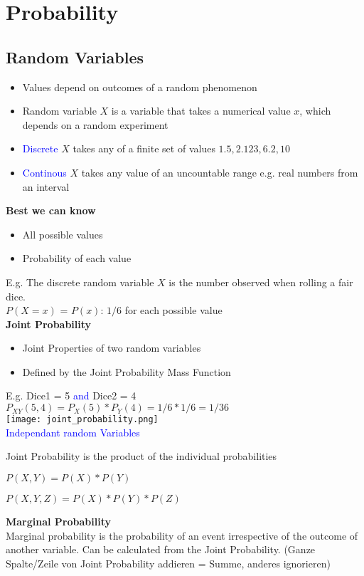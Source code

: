 \section{Probability}
\subsection{Random Variables}
\begin{itemize}
    \item Values depend on outcomes of a random phenomenon
    \item Random variable $X$ is a variable that takes a numerical value $x$, which depends on a random experiment
    \item \textcolor{blue}{Discrete} $X$ takes any of a finite set of values ${1.5, 2.123, 6.2, 10}$
    \item \textcolor{blue}{Continous} $X$ takes any value of an uncountable range e.g. real numbers from an interval
\end{itemize}
\vspace{10pt}
\textbf{Best we can know}
\begin{itemize}
    \item All possible values
    \item Probability of each value
\end{itemize}
E.g. The discrete random variable $X$ is the number observed when rolling a fair dice.\\
$P(X=x)$ = $P(x)$: $1/6$ for each possible value \\

\textbf{Joint Probability}
\begin{itemize}
    \item Joint Properties of two random variables
    \item Defined by the Joint Probability Mass Function
\end{itemize}
E.g. Dice1 = 5 \textcolor{blue}{and} Dice2 = 4\\
$P_{XY}(5,4) = P_X(5) * P_Y(4) = 1/6 * 1/6 = 1/36$\\
\texttt{[image: joint\_probability.png]} \\

\textcolor{blue}{Independant random Variables}

Joint Probability is the product of the individual probabilities

\begin{center}
    $P(X,Y) = P(X) * P(Y)$

    $P(X,Y,Z) = P(X) * P(Y) * P(Z)$
\end{center}
\vspace{10pt}
\textbf{Marginal Probability} \\
Marginal probability is the probability of an event irrespective of
the outcome of another variable. Can be calculated from the
Joint Probability. (Ganze Spalte/Zeile von Joint Probability addieren = Summe, anderes ignorieren) \\

